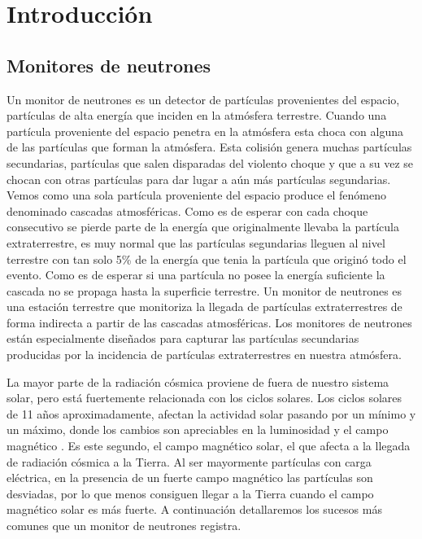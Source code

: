 \chapter{Introducción}
\label{cap1}

\section{Monitores de neutrones}
	Un monitor de neutrones es un detector de partículas provenientes del espacio, partículas de alta energía que inciden en la atmósfera terrestre. 
	Cuando una partícula proveniente del espacio penetra en la atmósfera esta choca con alguna de las partículas que forman la atmósfera. 
	Esta colisión genera muchas partículas secundarias, partículas que salen disparadas del violento choque y que a su vez 
	se chocan con otras partículas para dar lugar a aún más partículas segundarias. Vemos como una sola partícula proveniente del espacio produce el fenómeno 
	denominado cascadas atmosféricas. Como es de esperar con cada choque consecutivo se pierde parte de la energía que originalmente llevaba la 
	partícula extraterrestre, es muy normal que las partículas segundarias lleguen al nivel terrestre con tan solo 5\% de la energía que tenia la 
	partícula que originó todo el evento. Como es de esperar si una partícula no posee la energía suficiente la cascada no se propaga hasta la 
	superficie terrestre. Un monitor de neutrones es una estación terrestre que monitoriza la llegada de partículas extraterrestres de forma 
	indirecta a partir de las cascadas atmosféricas. Los monitores de neutrones están especialmente diseñados para capturar las partículas 
	secundarias producidas por la incidencia de partículas extraterrestres en nuestra atmósfera.
	\par
	La mayor parte de la radiación cósmica proviene de fuera de nuestro sistema solar, pero está fuertemente relacionada con 
	los ciclos solares. Los ciclos solares de 11 años aproximadamente, afectan la actividad solar pasando por un mínimo y un máximo, donde los
	cambios son apreciables en la luminosidad y el campo magnético \cite{SolarCicleWiki}. Es este segundo, el campo magnético solar, el que afecta a la llegada de 
	radiación cósmica a la Tierra. Al ser mayormente partículas con carga eléctrica, en la presencia de un fuerte campo magnético las partículas
	son desviadas, por lo que menos consiguen llegar a la Tierra cuando el campo magnético solar es más fuerte. A continuación detallaremos los
	sucesos más comunes que un monitor de neutrones registra. 
